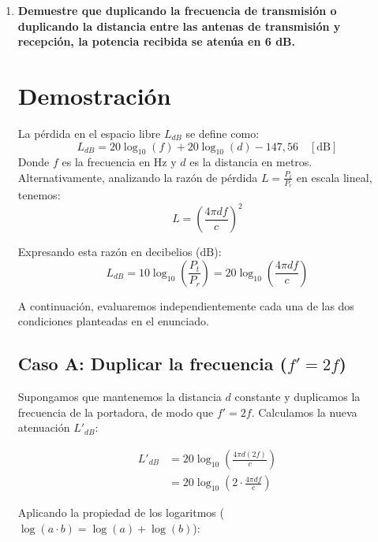 \documentclass[11pt,a4paper]{article}
\begin{document}
\begin{enumerate}[label=4.\arabic*), itemsep=0.3cm]
  \item
        \textbf{Demuestre que duplicando la frecuencia de transmisión o duplicando la distancia entre las antenas de transmisión y recepción, la potencia recibida se atenúa en 6 dB.} \\
        \section*{Demostración}

        La pérdida en el espacio libre $L_{dB}$ se define como:
        \begin{equation}
          L_{dB} = 20 \log_{10}(f) + 20 \log_{10}(d) - 147,56 \quad [\text{dB}]
        \end{equation}
        Donde $f$ es la frecuencia en Hz y $d$ es la distancia en metros.
        Alternativamente, analizando la razón de pérdida $L = \frac{P_t}{P_r}$ en escala lineal, tenemos:
        \begin{equation}
          L = \left( \frac{4\pi d f}{c} \right)^2
        \end{equation}

        Expresando esta razón en decibelios ($\text{dB}$):
        \begin{equation}
          L_{dB} = 10 \log_{10} \left( \frac{P_t}{P_r} \right) = 20 \log_{10} \left( \frac{4\pi d f}{c} \right)
        \end{equation}

        A continuación, evaluaremos independientemente cada una de las dos condiciones planteadas en el enunciado.

        \subsection*{Caso A: Duplicar la frecuencia ($f' = 2f$)}

        Supongamos que mantenemos la distancia $d$ constante y duplicamos la frecuencia de la portadora, de modo que $f' = 2f$. Calculamos la nueva atenuación $L'_{dB}$:

        \begin{align*}
          L'_{dB} & = 20 \log_{10} \left( \frac{4\pi d (2f)}{c} \right)      \\[0.5em]
                  & = 20 \log_{10} \left( 2 \cdot \frac{4\pi d f}{c} \right)
        \end{align*}

        Aplicando la propiedad de los logaritmos ($\log(a \cdot b) = \log(a) + \log(b)$):


\end{enumerate}
\end{document}
